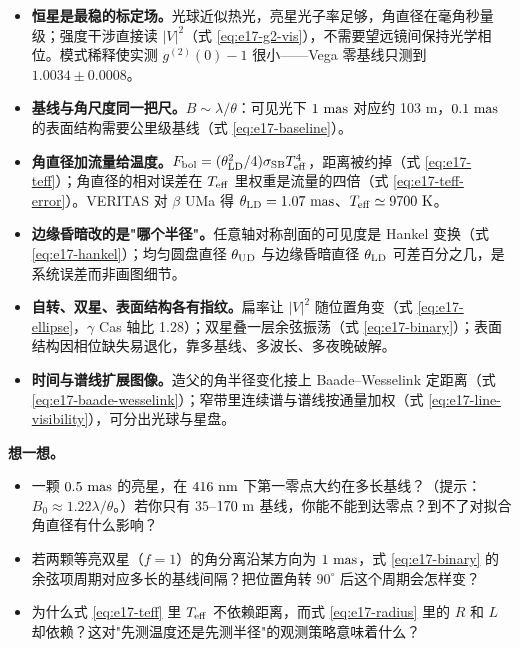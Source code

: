\begin{itemize}
  \item \textbf{恒星是最稳的标定场。}光球近似热光，亮星光子率足够，角直径在毫角秒量级；强度干涉直接读 \(|V|^2\)（式 \eqref{eq:e17-g2-vis}），不需要望远镜间保持光学相位。模式稀释使实测 \(g^{(2)}(0)-1\) 很小——Vega 零基线只测到 \(1.0034\pm0.0008\)。
  \item \textbf{基线与角尺度同一把尺。}\(B\sim\lambda/\theta\)：可见光下 \(1~{\rm mas}\) 对应约 103 m，\(0.1~{\rm mas}\) 的表面结构需要公里级基线（式 \eqref{eq:e17-baseline}）。
  \item \textbf{角直径加流量给温度。}\(F_{\rm bol}=(\theta_{\rm LD}^2/4)\sigma_{\rm SB}T_{\rm eff}^4\)，距离被约掉（式 \eqref{eq:e17-teff}）；角直径的相对误差在 \(T_{\rm eff}\) 里权重是流量的四倍（式 \eqref{eq:e17-teff-error}）。VERITAS 对 \(\beta\) UMa 得 \(\theta_{\rm LD}=1.07~{\rm mas}\)、\(T_{\rm eff}\simeq9700~{\rm K}\)。
  \item \textbf{边缘昏暗改的是"哪个半径"。}任意轴对称剖面的可见度是 Hankel 变换（式 \eqref{eq:e17-hankel}）；均匀圆盘直径 \(\theta_{\rm UD}\) 与边缘昏暗直径 \(\theta_{\rm LD}\) 可差百分之几，是系统误差而非画图细节。
  \item \textbf{自转、双星、表面结构各有指纹。}扁率让 \(|V|^2\) 随位置角变（式 \eqref{eq:e17-ellipse}，\(\gamma\) Cas 轴比 1.28）；双星叠一层余弦振荡（式 \eqref{eq:e17-binary}）；表面结构因相位缺失易退化，靠多基线、多波长、多夜晚破解。
  \item \textbf{时间与谱线扩展图像。}造父的角半径变化接上 Baade--Wesselink 定距离（式 \eqref{eq:e17-baade-wesselink}）；窄带里连续谱与谱线按通量加权（式 \eqref{eq:e17-line-visibility}），可分出光球与星盘。
\end{itemize}

\noindent\textbf{想一想。}
\begin{itemize}
  \item 一颗 \(0.5~{\rm mas}\) 的亮星，在 \(416~{\rm nm}\) 下第一零点大约在多长基线？（提示：\(B_0\approx1.22\lambda/\theta\)。）若你只有 \(35\)--\(170~{\rm m}\) 基线，你能不能到达零点？到不了对拟合角直径有什么影响？
  \item 若两颗等亮双星（\(f=1\)）的角分离沿某方向为 \(1~{\rm mas}\)，式 \eqref{eq:e17-binary} 的余弦项周期对应多长的基线间隔？把位置角转 \(90^\circ\) 后这个周期会怎样变？
  \item 为什么式 \eqref{eq:e17-teff} 里 \(T_{\rm eff}\) 不依赖距离，而式 \eqref{eq:e17-radius} 里的 \(R\) 和 \(L\) 却依赖？这对"先测温度还是先测半径"的观测策略意味着什么？
\end{itemize}
